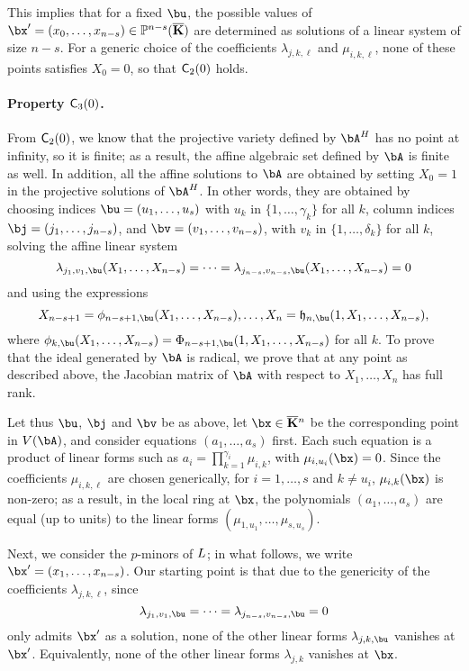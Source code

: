 \documentclass[12pt]{article}
\begin{document}
This implies that for a fixed $\bu$, the possible values of $\bx'=(x_0,\dots,x_{n-s}) \in \P^{n-s}(\KKbar)$ are
determined as solutions of a linear system of size $n-s$. For a
generic choice of the coefficients $\lambda_{j,k,\ell}$ and
$\mu_{i,k,\ell}$, none of these points satisfies $X_0=0$, so that
$\mathsf{C}_2(0)$ holds.

\paragraph{Property $\mathsf{C}_3(0)$.} From $\mathsf{C}_2(0)$, we know that
the projective variety defined by $\bA^\mH$ has no point at infinity,
so it is finite; as a result, the affine algebraic set defined by
$\bA$ is finite as well. In addition, all the affine solutions to
$\bA$ are obtained by setting $X_0=1$ in the projective solutions of
$\bA^\mH$. In other words, they are obtained by choosing indices
$\bu=(u_1,\dots,u_s)$ with $u_k$ in $\{1,\dots,\gamma_k\}$ for all $k$,
column indices $\bj=(j_1,\dots,j_{n-s})$, and
$\bv=(v_1,\dots,v_{n-s})$, with $v_k$ in $\{1,\dots,\delta_k\}$
for all $k$, solving the affine linear system
$$\lambda_{j_1,v_1,\bu}(X_1,\dots,X_{n-s})=\cdots=\lambda_{j_{n-s},v_{n-s},\bu}(X_1,\dots,X_{n-s})=0$$ 
and using the expressions
$$X_{n-s+1}=\phi_{n-s+1,\bu}(X_1,\dots,X_{n-s}),\dots,X_{n}=\mathfrak{h}_{n,\bu}(1,X_1,\dots,X_{n-s}),$$
where $\phi_{k,\bu}(X_1,\dots,X_{n-s})=\Phi_{n-s+1,\bu}(1,X_1,\dots,X_{n-s})$
for all $k$.
To prove that the ideal generated by $\bA$ is radical, we prove that
at any point as described above, the Jacobian matrix of $\bA$ with
respect to $X_1,\dots,X_n$ has full rank.

Let thus $\bu$, $\bj$ and $\bv$ be as above, let $\bx \in \KKbar{}^n$
be the corresponding point in $V(\bA)$, and consider equations
$(a_1,\dots,a_s)$ first. Each such equation is a product of linear forms
such as $a_i=\prod_{k=1}^{\gamma_i} \mu_{i,k}$, with $\mu_{i,u_i}(\bx)=0$.
Since the coefficients $\mu_{i,k,\ell}$ are chosen generically, for
$i=1,\dots,s$ and $k \ne u_i$, $\mu_{i,k}(\bx)$ is non-zero; as a
result, in the local ring at $\bx$, the polynomials $(a_1,\dots,a_s)$
are equal (up to units) to the linear forms
$(\mu_{1,u_1},\dots,\mu_{s,u_s})$.

Next, we consider the $p$-minors of ${L}$; in what follows, we 
write $\bx'=(x_1,\dots,x_{n-s})$. Our starting point is that due to 
the genericity of the coefficients $\lambda_{j,k,\ell}$, since 
$$\lambda_{j_1,v_1,\bu}=\cdots=\lambda_{j_{n-s},v_{n-s},\bu}=0$$
only admits $\bx'$ as a solution,
none of the other linear forms $\lambda_{j,k,\bu}$ vanishes at $\bx'$.
Equivalently, none of the other linear forms $\lambda_{j,k}$ vanishes at $\bx$.
\end{document}
